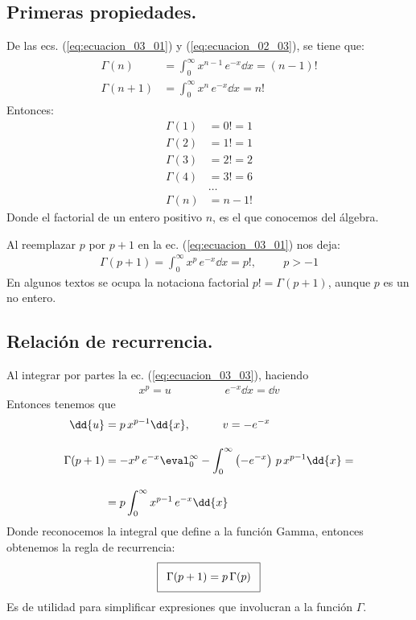 \subsection{Primeras propiedades.}
De las ecs. (\ref{eq:ecuacion_03_01}) y (\ref{eq:ecuacion_02_03}), se tiene que:
\begin{align}
\begin{aligned}
\Gamma (n) &= \int_{0}^{\infty} x^{n-1} \, e^{-x} \dd{x} = (n -1)! \\[1em]
\Gamma (n+1) &= \int_{0}^{\infty} x^{n} \, e^{-x} \dd{x} = n!
\end{aligned}
\label{eq:ecuacion_03_02}
\end{align}
Entonces:
\begin{align*}
\Gamma (1) &= 0! = 1 \\
\Gamma (2) &= 1! = 1 \\
\Gamma (3) &= 2! = 2 \\
\Gamma (4) &= 3! = 6 \\
&\ldots \\
\Gamma (n) &= n-1!
\end{align*}
Donde el factorial de un entero positivo $n$, es el que conocemos del álgebra.
\par
Al reemplazar $p$ por $p+1$ en la ec. (\ref{eq:ecuacion_03_01}) nos deja:
\begin{align}
\Gamma (p+1) = \int_{0}^{\infty} x^{p} \, e^{-x} \dd{x} = p!, \hspace{1cm} p > -1
\label{eq:ecuacion_03_03}
\end{align}
En algunos textos se ocupa la notaciona factorial $p! = \Gamma (p+1)$, aunque $p$ es un no entero.
\subsection{Relación de recurrencia.}
Al integrar por partes la ec. (\ref{eq:ecuacion_03_03}), haciendo
\begin{align*}
x^{p} =  u \hspace{2cm} e^{-x} \dd{x} =  \dd{v}
\end{align*}
Entonces tenemos que
\begin{align*}
\dd{u} &= p \, x^{p-1} \dd{x}, \hspace{1cm} v = - e^{-x} \\[1em]
\Gamma (p+1) &= -x^{p} \, e^{-x} \displaystyle \eval_{0}^{\infty} - \displaystyle \int_{0}^{\infty} \left(-e^{-x} \right) \, p \, x^{p-1} \dd{x} = \\[1em]
&= p \displaystyle \int_{0}^{\infty} x^{p-1} \, e^{-x} \dd{x}
\end{align*}
Donde reconocemos la integral que define a la función Gamma, entonces obtenemos la regla de recurrencia:  
\begin{align}\addtolength{\fboxsep}{5pt}\boxed{
\Gamma (p+1) = p \, \Gamma (p)}
\label{eq:ecuacion_03_04}
\end{align}
Es de utilidad para simplificar expresiones que involucran a la función $\Gamma$.
